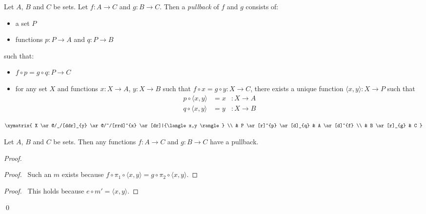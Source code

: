 \begin{df}
  [Pullback]
  Let $A$, $B$ and $C$ be sets. Let $f : A \rightarrow C$ and $g : B 
  \rightarrow C$. Then a \emph{pullback} of $f$ and $g$ consists of:
  \begin{itemize}
    \item a set $P$
    \item functions $p : P \rightarrow A$ and $q : P \rightarrow B$
  \end{itemize}
  such that:
  \begin{itemize}
    \item $f \circ p = g \circ q : P \rightarrow C$
    \item for any set $X$ and functions $x : X \rightarrow A$, $y : 
    X \rightarrow B$ such that $f \circ x = g \circ y : X \rightarrow C$, there 
    exists a unique function $\langle x,y \rangle : X \rightarrow P$ such that
    \begin{align*}
      p \circ \langle x,y \rangle & = x & : X \rightarrow A \\
      q \circ \langle x,y \rangle & = y & : X \rightarrow B
    \end{align*}
  \end{itemize}
  \[ \xymatrix{
    X \ar@/_/[ddr]_{y} \ar@/^/[rrd]^{x} \ar[dr]|{\langle x,y 
      \rangle} \\
    & P \ar[r]^{p} \ar[d]_{q} & A \ar[d]^{f} \\
    & B \ar[r]_{g} & C
  }\]
\end{df}

\begin{thm}
  Let $A$, $B$ and $C$ be sets. Then any functions $f : A \rightarrow C$ 
  and $g : B \rightarrow C$ have a pullback.
\end{thm}

\begin{proof}
  \pf
  \begin{proof}
    \pf\ Such an $m$ exists because $f \circ \pi_1 \circ \langle x,y \rangle = 
    g \circ \pi_2 \circ \langle x,y \rangle$.
  \end{proof}
  \begin{proof}
    \pf\ This holds because $e \circ m' = \langle x,y \rangle$.
  \end{proof}
  \qed
\end{proof}

